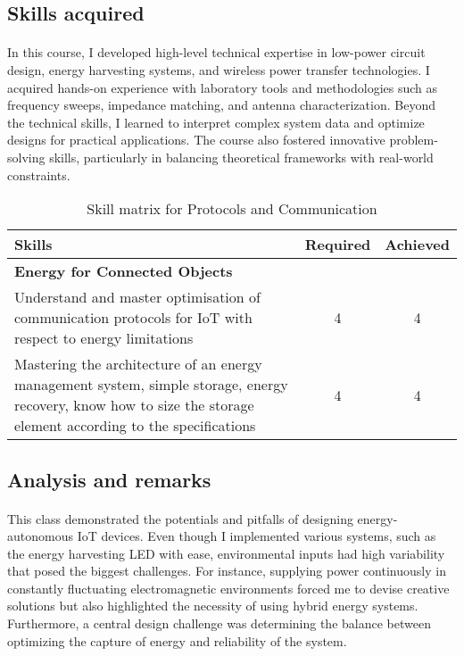 \subsection{Skills acquired}
\paragraph{}In this course, I developed high-level technical expertise in low-power circuit design, energy harvesting systems, and wireless power transfer technologies. I acquired hands-on experience with laboratory tools and methodologies such as frequency sweeps, impedance matching, and antenna characterization. Beyond the technical skills, I learned to interpret complex system data and optimize designs for practical applications. The course also fostered innovative problem-solving skills, particularly in balancing theoretical frameworks with real-world constraints.

\begin{table}[H]
    \centering
    \renewcommand{\arraystretch}{1.5} %
    \begin{tabular}{|p{11cm}|c|c|}
    \hline
    \rowcolor[gray]{0.8}
    \textbf{Skills} & \textbf{Required} & \textbf{Achieved} \\ \hline
    \rowcolor[gray]{0.9} \textbf{Energy for Connected Objects} &  &  \\ \hline
    Understand and master optimisation of communication protocols for IoT with respect to energy limitations & 4 & 4 \\ \hline
    Mastering the architecture of an energy management system, simple storage, energy recovery, know how to size the storage element according to the specifications & 4 & 4 \\ \hline
    \end{tabular}
    \caption{Skill matrix for Protocols and Communication}
    \label{table:skills-iot-energy-management}
\end{table}

\subsection{Analysis and remarks}
\paragraph{}This class demonstrated the potentials and pitfalls of designing energy-autonomous IoT devices. Even though I implemented various systems, such as the energy harvesting LED with ease, environmental inputs had high variability that posed the biggest challenges. For instance, supplying power continuously in constantly fluctuating electromagnetic environments forced me to devise creative solutions but also highlighted the necessity of using hybrid energy systems. Furthermore, a central design challenge was determining the balance between optimizing the capture of energy and reliability of the system.

